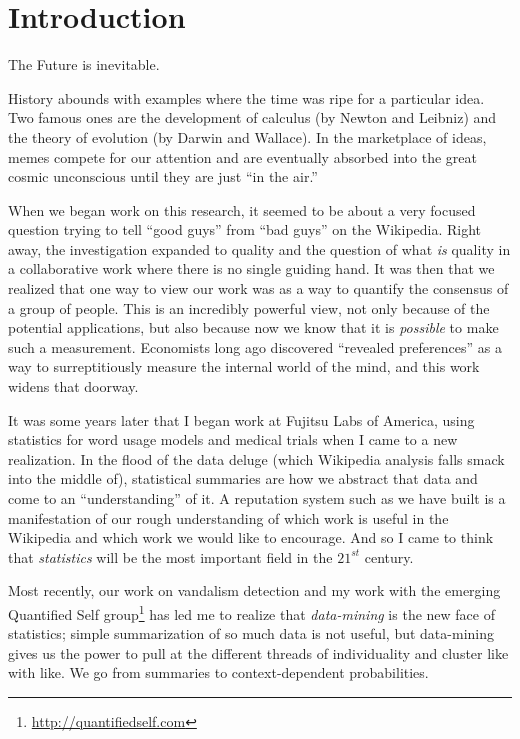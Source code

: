 \section{Introduction}

The Future is inevitable.

History abounds with examples where the time was ripe for a particular idea.
Two famous ones are the development of calculus (by Newton and Leibniz)
and the theory of evolution (by Darwin and Wallace).
In the marketplace of ideas, memes compete for our attention and
are eventually absorbed into the great cosmic unconscious until
they are just ``in the air.''

When we began work on this research, it seemed to be about a very focused
question trying to tell ``good guys'' from ``bad guys'' on the Wikipedia.
Right away, the investigation expanded to quality and the question of what
\textit{is} quality in a collaborative work where there is no single
guiding hand.
It was then that we realized that one way to view our work was as a
way to quantify the consensus of a group of people.
This is an incredibly powerful view, not only because of the potential
applications, but also because now we know that it is \textit{possible}
to make such a measurement.
Economists long ago discovered ``revealed preferences''
as a way to surreptitiously measure the internal world of the mind,
and this work widens that doorway.

It was some years later that I began work at Fujitsu Labs of America,
using statistics for word usage models and medical trials when I came to
a new realization.
In the flood of the data deluge (which Wikipedia analysis falls smack
into the middle of), statistical summaries are how we abstract that data
and come to an ``understanding'' of it.
A reputation system such as we have built is a manifestation of our
rough understanding of which work is useful in the Wikipedia and
which work we would like to encourage.
And so I came to think that \textit{statistics} will be the
most important field in the $21^{st}$ century.

Most recently, our work on vandalism detection and my work with the
emerging Quantified Self group\footnote{\url{http://quantifiedself.com}}
has led me to realize that
\textit{data-mining} is the new face of statistics; simple summarization
of so much data is not useful, but data-mining gives us the power to
pull at the different threads of individuality and cluster like with like.
We go from summaries to context-dependent probabilities.

